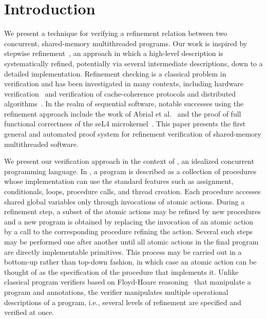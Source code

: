 \section{Introduction}
\label{sec:introduction}

We present a technique for verifying a refinement relation between two concurrent, shared-memory multithreaded programs. 
Our work is inspired by stepwise refinement~\cite{Wirth1971}, an approach in which a high-level description is systematically refined, 
potentially via several intermediate descriptions, down to a detailed implementation. 
Refinement checking is a classical problem in verification and has been investigated in many contexts, 
including hardware verification~\cite{Eiriksson2000} and verification of cache-coherence protocols and distributed algorithms~\cite{Lamport2004}.
In the realm of sequential software, notable successes using the refinement approach include the work of Abrial et al.~\cite{AbrialBHHMV10} 
and the proof of full functional correctness of the seL4 microkernel~\cite{KleinAEMSKH14}. 
This paper presents the first general and automated proof system for refinement verification of shared-memory multithreaded software. 

We present our verification approach in the context of \civl, an idealized concurrent programming language.
In \civl, a program is described as a collection of procedures whose implementation 
can use the standard features such as assignment, conditionals, loops, procedure calls, and thread creation. 
Each procedure accesses shared global variables only through invocations of atomic actions.
During a refinement step, a subset of the atomic actions may be refined by new procedures and a new program is 
obtained by replacing the invocation of an atomic action by a call to the corresponding procedure refining the action.
Several such steps may be performed one after another until all atomic actions in the final program are directly implementable primitives.
This process may be carried out in a bottom-up rather than top-down fashion, in which case an atomic action 
can be thought of as the specification of the procedure that implements it.
Unlike classical program verifiers based on Floyd-Hoare reasoning~\cite{Floyd67,Hoare69} that manipulate a program and annotations, 
the \civl verifier manipulates multiple operational descriptions of a program, i.e., several levels of refinement are specified and verified at once. 

